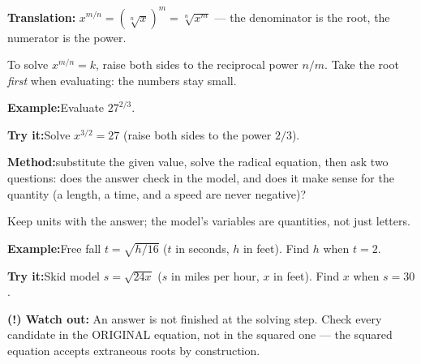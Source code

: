 \documentclass[12pt]{article}
\begin{document}
\begin{formulabox}\textbf{Translation:}\quad
$x^{m/n} = \left(\sqrt[n]{x}\right)^m = \sqrt[n]{x^m}$ --- the denominator is
the root, the numerator is the power.\par
To solve $x^{m/n} = k$, raise both sides to the reciprocal power $n/m$.
Take the root \emph{first} when evaluating: the numbers stay small.
\end{formulabox}
\begin{examplebox}\textbf{Example:}\quad Evaluate $27^{2/3}$.
\end{examplebox}
\begin{tryitbox}\textbf{Try it:}\quad Solve $x^{3/2} = 27$ (raise both sides
to the power $2/3$).\\[2pt]
\end{tryitbox}

\begin{formulabox}\textbf{Method:}\quad substitute the given value, solve the
radical equation, then ask two questions: does the answer check in the model,
and does it make sense for the quantity (a length, a time, and a speed are
never negative)?\par
Keep units with the answer; the model's variables are quantities, not just
letters.
\end{formulabox}
\begin{examplebox}\textbf{Example:}\quad Free fall $t = \sqrt{h/16}$ ($t$ in
seconds, $h$ in feet). Find $h$ when $t = 2$.
\end{examplebox}
\begin{tryitbox}\textbf{Try it:}\quad Skid model $s = \sqrt{24x}$ ($s$ in
miles per hour, $x$ in feet). Find $x$ when $s = 30$.\\[2pt]
\end{tryitbox}

\begin{watchoutbox}\textbf{(!) Watch out:} An answer is not finished at the
solving step. Check every candidate in the ORIGINAL equation, not in the
squared one --- the squared equation accepts extraneous roots by construction.
\end{watchoutbox}
\end{document}
